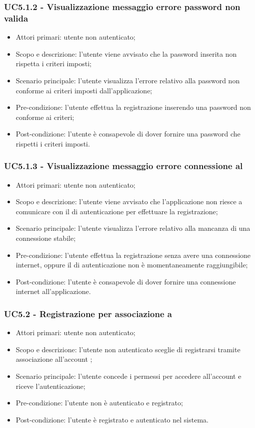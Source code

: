 \subsubsection{UC5.1.2 - Visualizzazione messaggio errore password non valida}
\begin{itemize}
	\item  Attori primari: utente non autenticato;
	\item  Scopo e descrizione: l'utente viene avvisato che la password inserita non rispetta i criteri imposti;
	\item  Scenario principale: l'utente visualizza l'errore relativo alla password non conforme ai criteri imposti dall'applicazione;
	\item  Pre-condizione: l'utente effettua la registrazione inserendo una password non conforme ai criteri;
	\item  Post-condizione: l'utente è consapevole di dover fornire una password che rispetti i criteri imposti.
\end{itemize}
\subsubsection{UC5.1.3 - Visualizzazione messaggio errore connessione al }
\begin{itemize}
	\item  Attori primari: utente non autenticato;
	\item  Scopo e descrizione: l'utente viene avvisato che l'applicazione non riesce a comunicare con il  di autenticazione per effettuare la registrazione;
	\item  Scenario principale: l'utente visualizza l'errore relativo alla mancanza di una connessione stabile;
	\item  Pre-condizione: l'utente effettua la registrazione senza avere una connessione internet, oppure il  di autenticazione non è momentaneamente raggiungibile;
	\item  Post-condizione: l'utente è consapevole di dover fornire una connessione internet all'applicazione.
\end{itemize}
\subsubsection{UC5.2 - Registrazione per associazione a }
\begin{itemize}
	\item  Attori primari: utente non autenticato;
	\item  Scopo e descrizione: l'utente non autenticato sceglie di registrarsi tramite associazione all'account ;
	\item  Scenario principale: l'utente concede i permessi per accedere all'account  e riceve l'autenticazione;
	\item  Pre-condizione: l'utente non è autenticato e registrato;
	\item  Post-condizione: l'utente è registrato e autenticato nel sistema.
\end{itemize}
